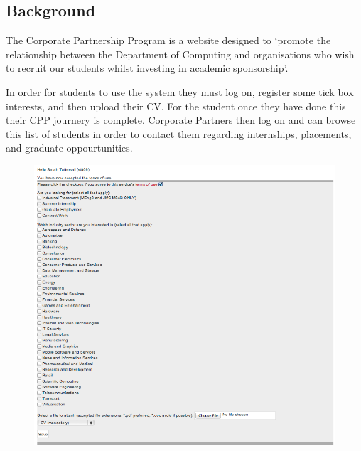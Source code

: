 \subsection{Background}
The Corporate Partnership Program is a website designed to `promote the relationship between the Department of Computing and organisations who wish to recruit our students whilst investing in academic sponsorship'\cite{doc-cpp}.

In order for students to use the system they must log on, register some tick box interests, and then upload their CV.
For the student once they have done this their CPP journery is complete.
Corporate Partners then log on and can browse this list of students in order to contact them regarding internships, placements, and graduate oppourtunities.

\begin{figure}[H]\centering
\includegraphics[scale=0.5]{images/introduction/old_cpp}
\end{figure}
